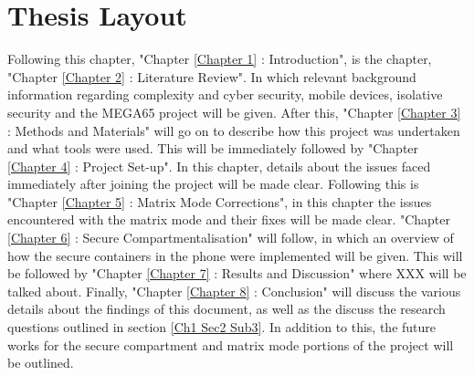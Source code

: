 \section{Thesis Layout}

\label{Ch1 Sec3}

Following this chapter, "Chapter \ref{Chapter 1} : Introduction", is the chapter, "Chapter \ref{Chapter 2} : Literature Review".
In which relevant background information regarding complexity and cyber security, mobile devices, isolative security and the MEGA65 project will be given.
After this, "Chapter \ref{Chapter 3} : Methods and Materials" will go on to describe how this project was undertaken and what tools were used.
This will be immediately followed by "Chapter \ref{Chapter 4} : Project Set-up".
In this chapter, details about the issues faced immediately after joining the project will be made clear.
Following this is "Chapter \ref{Chapter 5} : Matrix Mode Corrections", in this chapter the issues encountered with the matrix mode and their fixes will be made clear.
"Chapter \ref{Chapter 6} : Secure Compartmentalisation" will follow, in which an overview of how the secure containers in the phone were implemented will be given.
This will be followed by "Chapter \ref{Chapter 7} : Results and Discussion" where XXX will be talked about.
Finally, "Chapter \ref{Chapter 8} : Conclusion" will discuss the various details about the findings of this document, as well as the discuss the research questions outlined in section \ref{Ch1 Sec2 Sub3}. In addition to this, the future works for the secure compartment and matrix mode portions of the project will be outlined.

